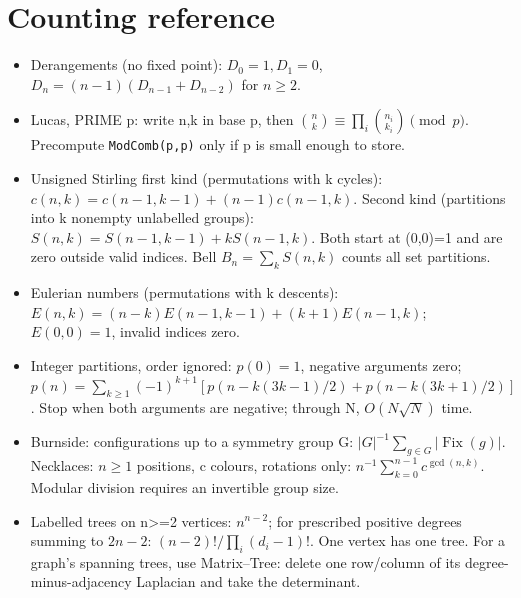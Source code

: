 \section{Counting reference}
\begin{itemize}[nosep,leftmargin=*]
\item Derangements (no fixed point): $D_0=1,D_1=0$,
$D_n=(n-1)(D_{n-1}+D_{n-2})$ for $n\ge2$.
\item Lucas, PRIME p: write n,k in base p, then
$\binom nk\equiv\prod_i\binom{n_i}{k_i}\pmod p$.
Precompute \texttt{ModComb(p,p)} only if p is small enough to store.
\item Unsigned Stirling first kind (permutations with k cycles):
$c(n,k)=c(n-1,k-1)+(n-1)c(n-1,k)$.
Second kind (partitions into k nonempty unlabelled groups):
$S(n,k)=S(n-1,k-1)+kS(n-1,k)$.
Both start at (0,0)=1 and are zero outside valid indices.
Bell $B_n=\sum_k S(n,k)$ counts all set partitions.
\item Eulerian numbers (permutations with k descents):
$E(n,k)=(n-k)E(n-1,k-1)+(k+1)E(n-1,k)$;
$E(0,0)=1$, invalid indices zero.
\item Integer partitions, order ignored: $p(0)=1$, negative arguments zero;
$p(n)=\sum_{k\ge1}(-1)^{k+1}[p(n-k(3k-1)/2)+p(n-k(3k+1)/2)]$.
Stop when both arguments are negative; through N, $O(N\sqrt N)$ time.
\item Burnside: configurations up to a symmetry group G:
$|G|^{-1}\sum_{g\in G}|\operatorname{Fix}(g)|$.
Necklaces: $n\ge1$ positions, c colours, rotations only:
$n^{-1}\sum_{k=0}^{n-1}c^{\gcd(n,k)}$.
Modular division requires an invertible group size.
\item Labelled trees on n>=2 vertices: $n^{n-2}$; for prescribed
positive degrees summing to $2n-2$: $(n-2)!/\prod_i(d_i-1)!$.
One vertex has one tree. For a graph's spanning trees, use Matrix--Tree:
delete one row/column of its degree-minus-adjacency Laplacian and take the determinant.
\end{itemize}
\par

